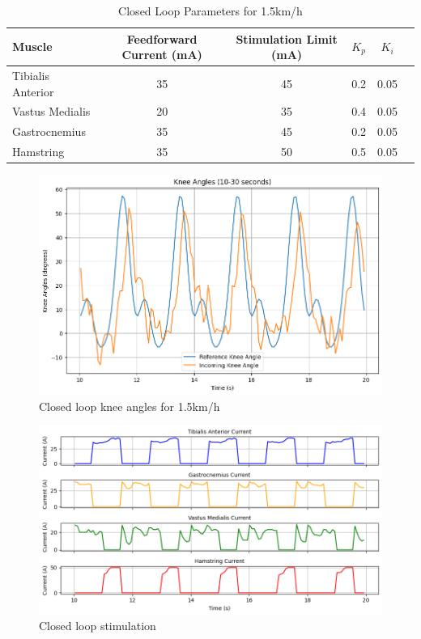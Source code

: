 \begin{table}[h!]
\centering
\caption{Closed Loop Parameters for 1.5km/h}
\begin{tabular}{|l|c|c|c|c|c|}
\hline
\textbf{Muscle}  & \textbf{Feedforward Current (mA)} & \textbf{Stimulation Limit (mA)} & \textbf{$K_p$} & \textbf{$K_i$} \\ \hline
Tibialis Anterior & 35 & 45 & 0.2 & 0.05 \\ \hline
Vastus Medialis   & 20 & 35 & 0.4 & 0.05 \\ \hline
Gastrocnemius     & 35 & 45 & 0.2 & 0.05 \\ \hline
Hamstring          & 35 & 50 & 0.5 & 0.05 \\ \hline
\end{tabular}
\label{tab:closed_loop_12}
\end{table}

\begin{figure} [H]
    \centering
    \includegraphics[width=0.9\linewidth]{images/CL12ref.png}
    \caption{Closed loop knee angles for 1.5km/h}
    \label{fig:cl12ref}
\end{figure}

\begin{figure} [H]
    \centering
    \includegraphics[width=0.9\linewidth]{images/CL12stim.png}
    \caption{Closed loop stimulation}
    \label{fig:cl12stim}
\end{figure}

